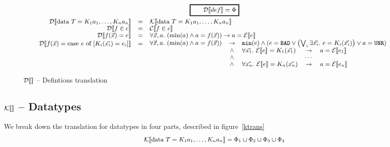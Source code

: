 \documentclass[preprint]{sigplanconf}
\begin{document}
\begin{figure}
\[
\begin{array}{rcl}
  \multicolumn{3}{c}{\ruleform{\dtrans{def} = \Phi}} \\[2.5mm]
  \dtrans{\mbox{data } T = K_1 a_1, \dots, K_n a_n} &=& \ktrans{\mbox{data } T = K_1 a_1, \dots, K_n a_n} \\
  \dtrans{f \in c} &=& \ctrans{f \in c}\\
  \dtrans{f(\vec{x}) = e} &=& \forall \vec{x},a.~ (\min{a} \land a =
  f(\vec{x})) \to a = \etrans{e} \\
   \raisebox{ 0.5 cm }{$\dtrans{f(\vec{x}) = \mbox{case } e \mbox{ of } [K_i(\vec{x_i}) = e_i]}$} &\raisebox{0.5cm}{=}&  \hspace{-0.18cm} \begin{array}{rclcl}
     \forall \vec{x},a.~(\mbox{min}(a) \land a = f(\vec{x})) &\to&
     \multicolumn{3}{c}{  \texttt{min}(e) \land (e = \texttt{BAD} \lor
       \left(\bigvee_i \exists \vec{x_i}.~e = K_i(\vec{x_i})\right) \lor a = \texttt{UNR})} \\
     &\land& \forall \vec{x_1}.~\etrans{e} = K_1(\vec{x_1}) &\to& a = \etrans{e_1} \\
     &\land& & \cdots & \\
     &\land& \forall \vec{x_n}.~\etrans{e} = K_n(\vec{x_n}) &\to& a = \etrans{e_n} \\%
   \end{array} 
\end{array}
\]
\caption{$\dtrans{}$ -- Defintions translation}
 \label{dtrans}
\end{figure}



\subsection{$\ktrans{}$ -- Datatypes}
We break down the translation for datatypes in four parts, described in figure~\ref{ktrans}
$$\ktrans{\mbox{data } T = K_1 a_1, \dots, K_n a_n} = \Phi_1 \cup \Phi_2 \cup \Phi_3 \cup \Phi_4$$
\end{document}
